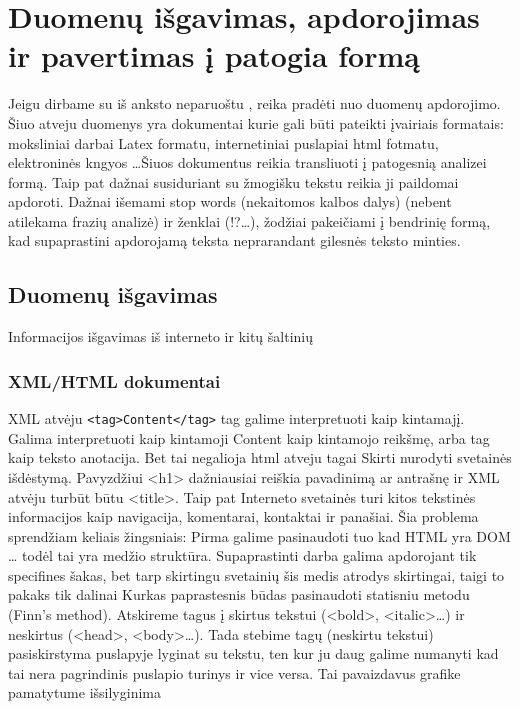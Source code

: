 \documentclass{VUMIFInfKursinis}
\begin{document}
\section{Duomenų išgavimas, apdorojimas ir pavertimas į patogia formą}
	Jeigu dirbame su iš anksto neparuoštu , reika pradėti nuo duomenų apdorojimo\cite{kadhim2014text}. Šiuo atveju duomenys yra dokumentai kurie gali būti pateikti įvairiais formatais: moksliniai darbai Latex formatu, internetiniai puslapiai html fotmatu, elektroninės kngyos \ldots Šiuos dokumentus reikia transliuoti į patogesnią analizei formą. Taip pat dažnai susiduriant su žmogišku tekstu reikia ji paildomai apdoroti. Dažnai išemami stop words (nekaitomos kalbos dalys) (nebent atilekama frazių analizė) ir ženklai (!?\ldots), žodžiai pakeičiami į bendrinię formą, kad supaprastini apdorojamą teksta neprarandant gilesnės teksto minties. 

\subsection{Duomenų išgavimas}
Informacijos išgavimas iš interneto ir kitų šaltinių

\subsubsection{XML/HTML dokumentai}
XML atvėju \texttt{<tag>Content</tag>} tag galime interpretuoti kaip kintamajį. Galima interpretuoti kaip  kintamoji Content kaip kintamojo reikšmę, arba tag kaip teksto anotacija. Bet tai negalioja html atveju tagai Skirti nurodyti svetainės išdėstymą. Pavyzdžiui <h1> dažniausiai reiškia pavadinimą ar antrašnę ir XML atvėju turbūt būtu <title>. Taip pat Interneto svetainės turi  kitos tekstinės informacijos kaip navigacija, komentarai, kontaktai ir panašiai. Šia problema sprendžiam keliais žingsniais:
Pirma galime pasinaudoti tuo kad HTML yra DOM … todėl tai yra medžio struktūra. Supaprastinti darba galima apdorojant tik specifines šakas, bet tarp skirtingu svetainių šis medis atrodys skirtingai, taigi to pakaks tik dalinai
Kurkas paprastesnis būdas pasinaudoti statisniu metodu (Finn’s method). Atskireme tagus į skirtus tekstui (<bold>, <italic>\ldots) ir neskirtus (<head>, <body>\ldots). Tada stebime tagų (neskirtu tekstui) pasiskirstyma puslapyje lyginat su tekstu, ten kur ju daug galime numanyti kad tai nera pagrindinis puslapio turinys ir vice versa. Tai pavaizdavus grafike pamatytume išsilyginima
\end{document}
